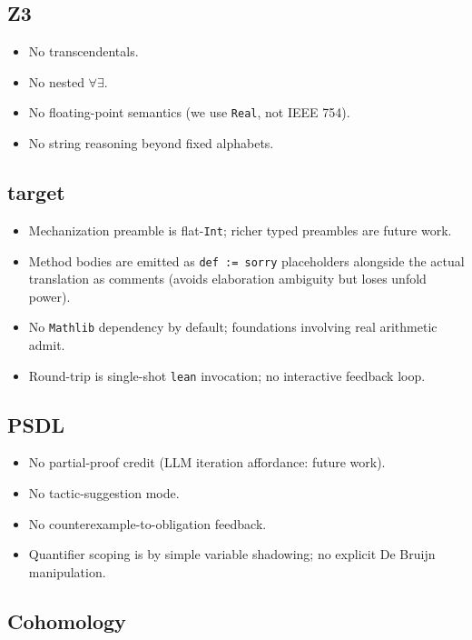 \subsection{Z3}

\begin{itemize}[leftmargin=1.7em]
  \item No transcendentals.
  \item No nested $\forall \exists$.
  \item No floating-point semantics (we use \texttt{Real}, not
    IEEE 754).
  \item No string reasoning beyond fixed alphabets.
\end{itemize}

\subsection{\Lean{} target}

\begin{itemize}[leftmargin=1.7em]
  \item Mechanization preamble is flat-\texttt{Int}; richer typed
    preambles are future work.
  \item Method bodies are emitted as \texttt{def := sorry}
    placeholders alongside the actual translation as comments
    (avoids elaboration ambiguity but loses unfold power).
  \item No \texttt{Mathlib} dependency by default; foundations
    involving real arithmetic admit.
  \item Round-trip is single-shot \texttt{lean} invocation; no
    interactive feedback loop.
\end{itemize}

\subsection{PSDL}

\begin{itemize}[leftmargin=1.7em]
  \item No partial-proof credit (LLM iteration affordance: future
    work).
  \item No tactic-suggestion mode.
  \item No counterexample-to-obligation feedback.
  \item Quantifier scoping is by simple variable shadowing; no
    explicit De Bruijn manipulation.
\end{itemize}

\subsection{Cohomology}

